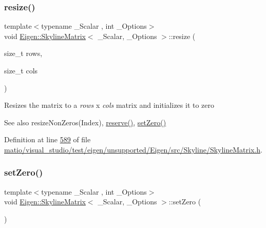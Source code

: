 \subsubsection{\texorpdfstring{resize()}{resize()}\hspace{0.1cm}{\footnotesize\ttfamily [2/2]}}
{\footnotesize\ttfamily template$<$typename \+\_\+\+Scalar , int \+\_\+\+Options$>$ \\
void \hyperlink{class_eigen_1_1_skyline_matrix}{Eigen\+::\+Skyline\+Matrix}$<$ \+\_\+\+Scalar, \+\_\+\+Options $>$\+::resize (\begin{DoxyParamCaption}\item[{size\+\_\+t}]{rows,  }\item[{size\+\_\+t}]{cols }\end{DoxyParamCaption})\hspace{0.3cm}{\ttfamily [inline]}}

Resizes the matrix to a {\itshape rows} x {\itshape cols} matrix and initializes it to zero \begin{DoxySeeAlso}{See also}
resize\+Non\+Zeros(\+Index), \hyperlink{class_eigen_1_1_skyline_matrix_aac6da20a87fca9d4cb6b871504497577}{reserve()}, \hyperlink{class_eigen_1_1_skyline_matrix_afeb349e5dc4b5d8c107ff067b44438f5}{set\+Zero()} 
\end{DoxySeeAlso}


Definition at line \hyperlink{matio_2visual__studio_2test_2eigen_2unsupported_2_eigen_2src_2_skyline_2_skyline_matrix_8h_source_l00589}{589} of file \hyperlink{matio_2visual__studio_2test_2eigen_2unsupported_2_eigen_2src_2_skyline_2_skyline_matrix_8h_source}{matio/visual\+\_\+studio/test/eigen/unsupported/\+Eigen/src/\+Skyline/\+Skyline\+Matrix.\+h}.

\mbox{\label{class_eigen_1_1_skyline_matrix_afeb349e5dc4b5d8c107ff067b44438f5}} 
\subsubsection{\texorpdfstring{set\+Zero()}{setZero()}\hspace{0.1cm}{\footnotesize\ttfamily [1/2]}}
{\footnotesize\ttfamily template$<$typename \+\_\+\+Scalar , int \+\_\+\+Options$>$ \\
void \hyperlink{class_eigen_1_1_skyline_matrix}{Eigen\+::\+Skyline\+Matrix}$<$ \+\_\+\+Scalar, \+\_\+\+Options $>$\+::set\+Zero (\begin{DoxyParamCaption}{ }\end{DoxyParamCaption})\hspace{0.3cm}{\ttfamily [inline]}}

